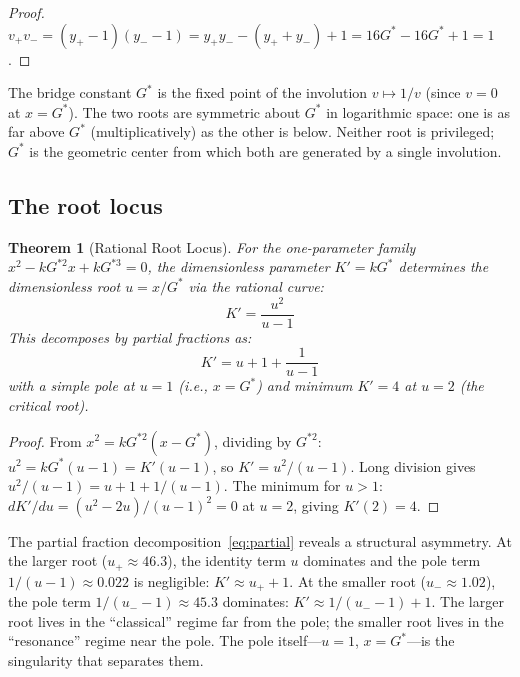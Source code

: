 \documentclass[12pt]{article}
\newtheorem{theorem}{Theorem}[section]
\theoremstyle{definition}
\theoremstyle{remark}
\begin{document}
\begin{proof}
$v_+ v_- = (y_+ - 1)(y_- - 1) = y_+ y_- - (y_+ + y_-) + 1 = 16G^* - 16G^* + 1 = 1$. \qedhere
\end{proof}

The bridge constant $G^*$ is the fixed point of the involution $v \mapsto 1/v$ (since $v = 0$ at $x = G^*$). The two roots are symmetric about $G^*$ in logarithmic space: one is as far above $G^*$ (multiplicatively) as the other is below. Neither root is privileged; $G^*$ is the geometric center from which both are generated by a single involution.

\subsection{The root locus}

\begin{theorem}[Rational Root Locus]
\label{thm:locus}
For the one-parameter family $x^2 - kG^{*2}x + kG^{*3} = 0$, the dimensionless parameter $K' = kG^*$ determines the dimensionless root $u = x/G^*$ via the rational curve:
\begin{equation}
    K' = \frac{u^2}{u - 1}
    \label{eq:locus}
\end{equation}
This decomposes by partial fractions as:
\begin{equation}
    K' = u + 1 + \frac{1}{u-1}
    \label{eq:partial}
\end{equation}
with a simple pole at $u = 1$ (i.e., $x = G^*$) and minimum $K' = 4$ at $u = 2$ (the critical root).
\end{theorem}

\begin{proof}
From $x^2 = kG^{*2}(x - G^*)$, dividing by $G^{*2}$: $u^2 = kG^*(u - 1) = K'(u-1)$, so $K' = u^2/(u-1)$. Long division gives $u^2/(u-1) = u + 1 + 1/(u-1)$. The minimum for $u > 1$: $dK'/du = (u^2 - 2u)/(u-1)^2 = 0$ at $u = 2$, giving $K'(2) = 4$. \qedhere
\end{proof}

The partial fraction decomposition~\eqref{eq:partial} reveals a structural asymmetry. At the larger root ($u_+ \approx 46.3$), the identity term $u$ dominates and the pole term $1/(u-1) \approx 0.022$ is negligible: $K' \approx u_+ + 1$. At the smaller root ($u_- \approx 1.02$), the pole term $1/(u_- - 1) \approx 45.3$ dominates: $K' \approx 1/(u_- - 1) + 1$. The larger root lives in the ``classical'' regime far from the pole; the smaller root lives in the ``resonance'' regime near the pole. The pole itself---$u = 1$, $x = G^*$---is the singularity that separates them.
\end{document}
